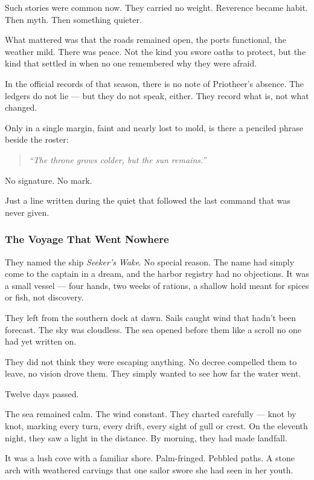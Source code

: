 \documentclass[12pt]{article}
\begin{document}
Such stories were common now. They carried no weight. Reverence became habit. Then myth. Then something quieter.

What mattered was that the roads remained open, the ports functional, the weather mild. There was peace. Not the kind you swore oaths to protect, but the kind that settled in when no one remembered why they were afraid.

In the official records of that season, there is no note of Priotheer’s absence. The ledgers do not lie — but they do not speak, either. They record what is, not what changed.

Only in a single margin, faint and nearly lost to mold, is there a penciled phrase beside the roster:

\begin{quote}
\emph{“The throne grows colder, but the sun remains.”}
\end{quote}

No signature. No mark.

Just a line written during the quiet that followed the last command that was never given.

\dotfill

\subsubsection{The Voyage That Went Nowhere}

They named the ship \emph{Seeker’s Wake}. No special reason. The name had simply come to the captain in a dream, and the harbor registry had no objections. It was a small vessel — four hands, two weeks of rations, a shallow hold meant for spices or fish, not discovery.

They left from the southern dock at dawn. Sails caught wind that hadn’t been forecast. The sky was cloudless. The sea opened before them like a scroll no one had yet written on.

They did not think they were escaping anything. No decree compelled them to leave, no vision drove them. They simply wanted to see how far the water went.

Twelve days passed.

The sea remained calm. The wind constant. They charted carefully — knot by knot, marking every turn, every drift, every sight of gull or crest. On the eleventh night, they saw a light in the distance. By morning, they had made landfall.

It was a lush cove with a familiar shore. Palm-fringed. Pebbled paths. A stone arch with weathered carvings that one sailor swore she had seen in her youth.
\end{document}
